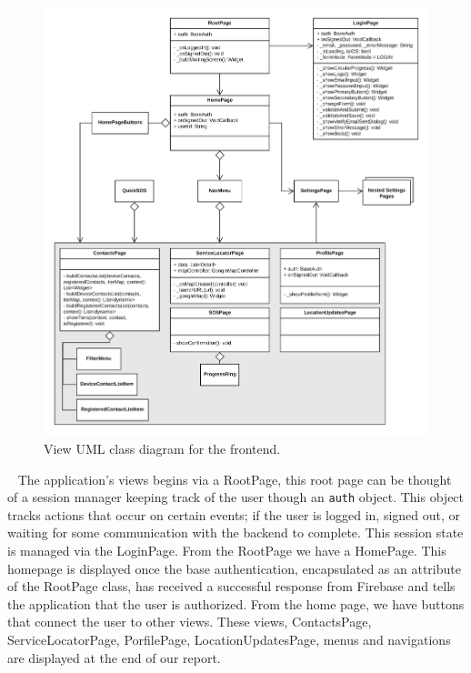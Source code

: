\documentclass[10pt, a4paper]{article}
\begin{document}
\begin{figure}[H]
\begin{center}
\centerline{
	\includegraphics[scale=.23]{final-diagrams/Views-UML.png}
}
\caption{View UML class diagram for the frontend.}
\end{center}	
\end{figure}

\par ~ The application's views begins via a RootPage, this root page can be thought of a session manager keeping track of the user though an \texttt{auth} object. This object tracks actions that occur on certain events; if the user is logged in, signed out, or waiting for some communication with the backend to complete. This session state is managed via the LoginPage. From the RootPage we have a HomePage. This homepage is displayed once the base authentication, encapsulated as an attribute of the RootPage class, has received a successful response from Firebase and tells the application that the user is authorized. From the home page, we have buttons that connect the user to other views. These views, ContactsPage, ServiceLocatorPage, PorfilePage, LocationUpdatesPage, menus and navigations are displayed at the end of our report. 
\end{document}
